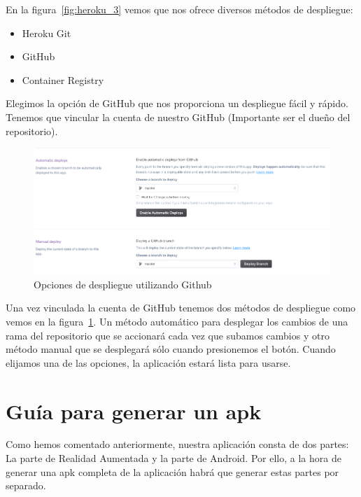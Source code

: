 En la figura~\ref{fig:heroku_3} vemos que nos ofrece diversos métodos de despliegue:
\begin{itemize}
    \item Heroku Git
    \item GitHub
    \item Container Registry
\end{itemize}
Elegimos la opción de GitHub que nos proporciona un despliegue fácil y rápido. Tenemos que vincular la cuenta de nuestro GitHub (Importante ser el dueño del repositorio).
\begin{figure}[H]
    \centering
    \includegraphics[width=6in]{figures/chapter-4/heroku_4.png}
    \caption{Opciones de despliegue utilizando Github}
    \label{fig:heroku_4}
\end{figure}
Una vez vinculada la cuenta de GitHub tenemos dos métodos de despliegue como vemos en la figura~\ref{fig:heroku_4}. Un método automático para desplegar los cambios de una rama del repositorio que se accionará cada vez que subamos cambios y otro método manual que se desplegará sólo cuando presionemos el botón. 
Cuando elijamos una de las opciones, la aplicación estará lista para usarse.

\section{Guía para generar un apk}
Como hemos comentado anteriormente, nuestra aplicación consta de dos partes: La parte de Realidad Aumentada y 
la parte de Android. Por ello, a la hora de generar una apk completa de la aplicación habrá que generar estas partes 
por separado.

